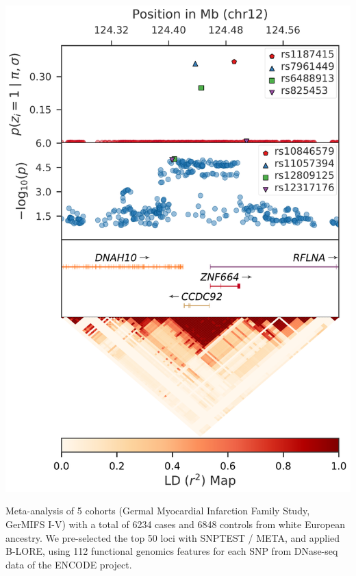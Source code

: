 \documentclass[a0paper,portrait,debug]{baposter}
\begin{document}
\begin{poster}
{\begin{center}
    \includegraphics[height=\myfigheight, keepaspectratio]{Locus_013.pdf}
  \end{center}
Meta-analysis of 5 cohorts (Germal Myocardial Infarction Family Study, GerMIFS I-V) with a total of 6234 cases and 6848 controls from white European ancestry. 
We pre-selected the top 50 loci with SNPTEST / META, and applied B-LORE, using 112 functional genomics features for each SNP from DNase-seq data of the ENCODE project.
}


\end{poster}
\end{document}
